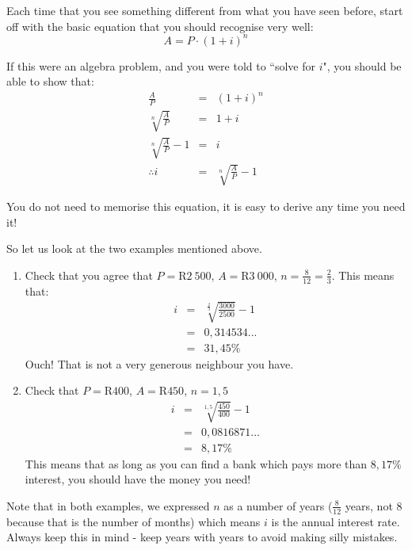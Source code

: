 Each time that you see something different from what you have seen before, start off with the basic equation that you should recognise very well:
\begin{equation*}
A = P \cdot (1+i)^n
\end{equation*}

If this were an algebra problem, and you were told to ``solve for $i$", you should be able to show that:
\begin{eqnarray*}
\frac{A}{P} &=& (1 + i)^n\\
\sqrt[n]{\frac{A}{P}} &=& 1 + i\\
\sqrt[n]{\frac{A}{P}} -1 &=& i\\
\therefore i &=& \sqrt[n]{\frac{A}{P}} -1 
\end{eqnarray*}

You do not need to memorise this equation, it is easy to derive any time you need it!

So let us look at the two examples mentioned above.

\begin{enumerate}
\item{Check that you agree that $P=$R$2~500$, $A=$R$3~000$, $n= \frac{8}{12}=\frac{2}{3}$. This means that:
\begin{eqnarray*}
i &=& \sqrt[\frac{2}{3}]{\frac{3000}{2500}} - 1\\
&=& 0,314534...\\
&=& 31,45\%
\end{eqnarray*}
Ouch! That is not a very generous neighbour you have.}

\item{Check that $P=$R$400$, $A=$R$450$, $n=1,5$
\begin{eqnarray*}
i &=& \sqrt[1,5]{\frac{450}{400}} - 1\\
&=& 0,0816871...\\
&=& 8,17\%
\end{eqnarray*}
This means that as long as you can find a bank which pays more than $8,17\%$ interest, you should have the money you need!}
\end{enumerate}

Note that in both examples, we expressed $n$ as a number of years ($\frac{8}{12}$ years, not $8$ because that is the number of months) which means $i$ is the annual interest rate. Always keep this in mind - keep years with years to avoid making silly mistakes.

